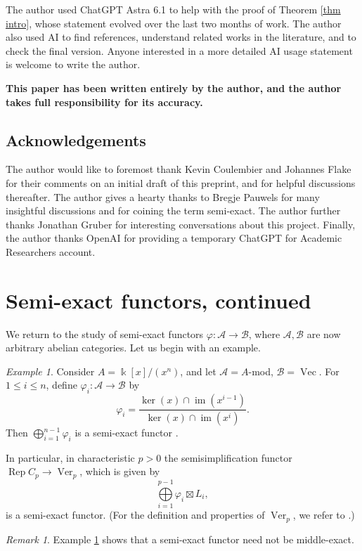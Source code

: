 \documentclass[11pt]{amsart}
\def\ker{\operatorname{ker}}
\def\As{\mathscr{A}}
\def\Bs{\mathscr{B}}
\def\Rep{\operatorname{Rep}}
\def\Ver{\operatorname{Ver}}
\def\Vec{\operatorname{Vec}}
\theoremstyle{definition}
\theoremstyle{remark}
\newtheorem{remark}[thm]{Remark}
\newtheorem{example}[thm]{Example}
\numberwithin{equation}{section}
\begin{document}
The author used ChatGPT Astra 6.1 to help with the proof of Theorem \ref{thm intro}, whose statement evolved over the last two months of work.  The author also used AI to find references, understand related works in the literature, and to check the final version.  Anyone interested in a more detailed AI usage statement is welcome to write the author.

\textbf{This paper has been written entirely by the author, and the author takes full responsibility for its accuracy.}

\subsection{Acknowledgements} The author would like to foremost thank Kevin Coulembier and Johannes Flake for their comments on an initial draft of this preprint, and for helpful discussions thereafter.  The author gives a hearty thanks to Bregje Pauwels for many insightful discussions and for coining the term semi-exact.  The author further thanks Jonathan Gruber for interesting conversations about this project. Finally, the author thanks OpenAI for providing a temporary ChatGPT for Academic Researchers account.




\section{Semi-exact functors, continued}

We return to the study of semi-exact functors $\varphi:\As\to\Bs$, where $\As,\Bs$ are now arbitrary abelian categories.  Let us begin with an example.

\begin{example}\label{example 1}
    Consider $A=\Bbbk[x]/(x^n)$, and let $\As=A$-mod, $\Bs=\Vec$.  For $1\leq i\leq n$, define $\varphi_i:\As\to\Bs$ by 
    \[
\varphi_i=\frac{\ker(x)\cap\operatorname{im}(x^{i-1})}{{\ker(x)\cap\operatorname{im}(x^i)}}.
    \]
    Then $\bigoplus\limits_{i=1}^{n-1}\varphi_i$ is a semi-exact functor \cite[Lem.~3.3.3]{HKPSYZ}.  

    In particular, in characteristic $p>0$ the semisimplification functor $\Rep C_p\to\Ver_p$, which is given by
    \[
    \bigoplus\limits_{i=1}^{p-1}\varphi_i\boxtimes L_i,
    \]
    is a semi-exact functor.  (For the definition and properties of $\Ver_p$, we refer to \cite{EO}.)
\end{example}

\begin{remark}
    Example \ref{example 1} shows that a semi-exact functor need not be middle-exact. 
\end{remark}
\end{document}
